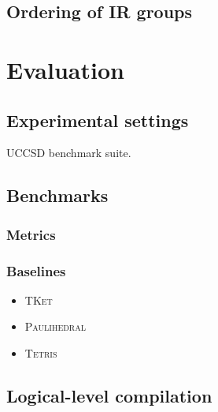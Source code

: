 \documentclass[conference]{IEEEtran}
\newcommand{\tket}{\textsc{TKet}}
\newcommand{\tetris}{\textsc{Tetris}}
\newcommand{\paulihedral}{\textsc{Paulihedral}}
\begin{document}
\subsection{Ordering of IR groups}



\section{Evaluation}


\subsection{Experimental settings}


\begin{table}[tbp]
    \centering
    \caption{UCCSD benchmark suite.}
    \setlength{\tabcolsep}{4.2pt}
    \scalebox{0.876}{
        
    }
    \label{tab:uccsd}
    
\end{table}

\subsection{Benchmarks}


\subsubsection{Metrics}

\subsubsection{Baselines}

\begin{itemize}
    \item \tket
    \item \paulihedral
    \item \tetris
\end{itemize}



\subsection{Logical-level compilation}
\end{document}
